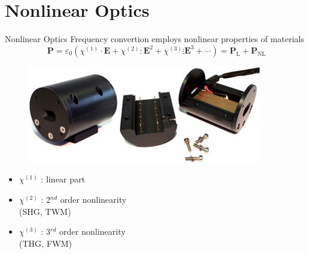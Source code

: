 \documentclass[11pt, leqno]{beamer}
\begin{document}
\section{Nonlinear Optics}
\begin{frame}{Nonlinear Optics}
	Frequency convertion employs nonlinear properties of materials
	\begin{equation}
		\textbf{P} = \varepsilon_0 \left( \chi^{(1)} \cdot \textbf{E} + \chi^{(2)} : \textbf{E}^2 + \chi^{(3)} \vdots \textbf{E}^3 + \cdots \right) = \mathrm{\textbf{P}_L} + \mathrm{\textbf{P}_{NL}}
		\label{eq_P_general}
	\end{equation}
	\begin{figure}
		\centering
		\includegraphics[width=.5\textwidth]{ppln-ovens2.jpg}
	\end{figure}
	\begin{itemize}
	\item	$\chi^{(1)}$	:	linear part
	\item	$\chi^{(2)}$	:	2$^{nd}$ order nonlinearity\\ \hspace{25pt} (SHG, TWM)
	\item	$\chi^{(3)}$	:	3$^{rd}$ order nonlinearity\\ \hspace{25pt} (THG, FWM)
	\end{itemize}
\end{frame}
\end{document}

